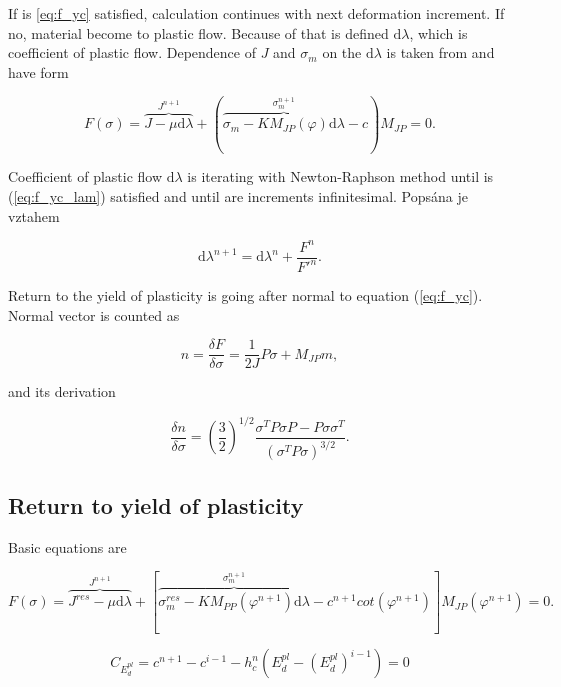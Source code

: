 If is \ref{eq:f_yc} satisfied, calculation continues with next deformation increment. If no, material become to plastic flow. Because of that is defined $\mathrm{d}\lambda$, which is coefficient of plastic flow. Dependence of $J$ and $\sigma_m$ on the $\mathrm{d}\lambda$ is taken from \cite{drucker} and have form

\begin{equation}\label{eq:f_yc_lam}
F(\sigma)= \overbrace{J-\mu\mathrm{d}\lambda}^{J^{n+1}} + (\overbrace{\sigma_m-K M_{JP}(\varphi)\mathrm{d}\lambda}^{\sigma_m^{n+1}}-c)M_{JP}=0.
\end{equation}

Coefficient of plastic flow $\mathrm{d}\lambda$ is iterating with Newton-Raphson method until is (\ref{eq:f_yc_lam}) satisfied and until are increments infinitesimal. Popsána je vztahem

\begin{equation}\label{eq:f_d_lam}
\mathrm{d}\lambda^{n+1} = \mathrm{d}\lambda^n + \frac{F^n}{F'^n}.
\end{equation}

Return to the yield of plasticity is going after normal to equation (\ref{eq:f_yc}). Normal vector is counted as \cite{drucker}

\begin{equation}\label{eq:f_n}
n = \frac{\delta F}{\delta \sigma} = \frac{1}{2J}P \sigma + M_{JP}m, 
\end{equation}

and its derivation

\begin{equation}\label{eq:f_dn}
\frac{\delta n}{\delta \sigma} = \left(\frac{3}{2}\right)^{1/2} \frac{\sigma^T P \sigma P - P \sigma \sigma^T}{(\sigma^T P \sigma)^{3/2}}.
\end{equation}
\newpage
\subsection{Return to yield of plasticity}\label{sec:drucker-prager_return}
\indent

Basic equations are

\begin{equation}\label{eq:f_r}
F(\sigma)= \overbrace{J^{res}-\mu\mathrm{d}\lambda}^{J^{n+1}} + [\overbrace{\sigma_m^{res} - K M_{PP}(\varphi^{n+1})\mathrm{d}\lambda}^{\sigma_m^{n+1}}-c^{n+1}cot(\varphi^{n+1})]M_{JP}(\varphi^{n+1})=0.
\end{equation}

\begin{equation}\label{eq:C}
C_{E_d^{pl}} = c^{n+1} - c^{i-1} - h_c^n (E_d^{pl}-(E_d^{pl})^{i-1})=0
\end{equation}

